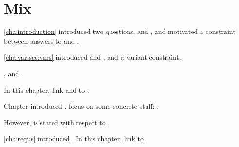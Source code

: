 \chapter{Mix}
\label{cha:binding}

\begin{note}
  \autoref{cha:introduction} introduced two questions, \qWhy{} and \qHow{}, and motivated a constraint between answers to \qWhy{} and \qHow{}.

  \autoref{cha:var:sec:vars} introduced \qWhyV{} and \qHowV{}, and a variant constraint.

  \fc{}, and \requ{}.

  In this chapter, link  and  to \qWhyV{}.
\end{note}

\begin{note}
  Chapter introduced .
   focus on some concrete stuff: .

  However, \qWhyV{} is stated with respect to \ros{}.
\end{note}


\begin{note}
  \autoref{cha:requs} introduced .
  In this chapter, link  to \qWhyV{}.
\end{note}




